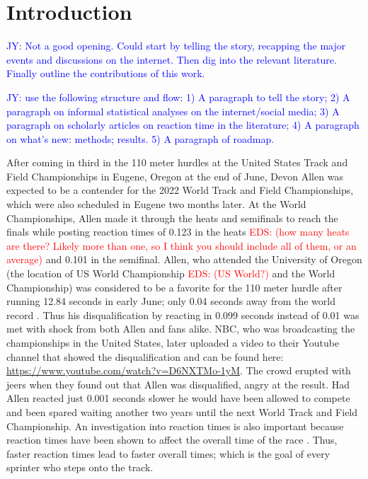 \documentclass[12pt, letterpaper, titlepage]{article}
\newcommand{\jy}[1]{\textcolor{blue}{JY: #1}}
\newcommand{\eds}[1]{\textcolor{red}{EDS: (#1)}}
\begin{document}
\section{Introduction}
\label{sec:intro}


\jy{Not a good opening. Could start by telling the story, recapping the major
  events and discussions on the internet. Then dig into the relevant
  literature. Finally outline the contributions of this work.
}


\jy{use the following structure and flow:
  1) A paragraph to tell the story;
  2) A paragraph on informal statistical analyses on the internet/social media;
  3) A paragraph on scholarly articles on reaction time in the literature;
  4) A paragraph on what's new: methods; results.
  5) A paragraph of roadmap.}


After coming in third in the 110 meter hurdles at the United States Track and 
Field Championships in Eugene, Oregon at the end of June, Devon Allen was 
expected to 
be a contender for the 2022 World Track and Field Championships, which were also 
scheduled in Eugene 
two months later. At the World Championships, Allen made it through the 
heats and semifinals to reach the finals while posting reaction times of 0.123
in the heats \eds{how many heats are there? Likely more than one, so I think you
should include all of them, or an average} and 0.101 in the semifinal.  
Allen, who attended the University
of Oregon (the location of US World Championship \eds{US World?} and the World 
Championship) was
considered to be a favorite for the 110 meter hurdle after running 12.84 seconds
in early June; only 0.04 seconds away from the world record \citep{wa2022preview}.
Thus his disqualification by reacting in 0.099 seconds instead of 0.01 was met
with shock from both Allen and fans alike.  NBC, who was broadcasting the
championships in the United States, later uploaded a video to their Youtube
channel that showed the disqualification and can be found here:
\url{https://www.youtube.com/watch?v=D6NXTMo-1yM}. The crowd erupted with jeers 
when they found out that Allen was disqualified, angry at the result.  Had Allen 
reacted just 0.001 seconds slower he would have been allowed to compete and been 
spared waiting another two years until the next World Track and Field Championship.
An investigation into reaction times is also important because reaction times have
been shown to affect the overall time of the race \citep{delalija2008reaction}.
Thus, faster reaction times lead to faster overall times; which is the goal of
every sprinter who steps onto the track.
\end{document}
